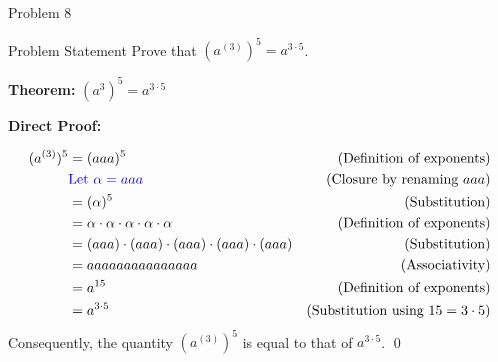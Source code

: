 \begin{problem}{Problem 8}
    \begin{statement}{Problem Statement}
        Prove that $(a^{(3)})^{5} = a^{3\cdot5}$.
    \end{statement}

    \begin{highlight}[Solution]
        \textbf{Theorem:} $(a^{3})^{5} = a^{3\cdot 5}$ \vspace*{1em}

        \textbf{Direct Proof:} \vspace*{1em}

        \begin{align*}
            (a^{(3)})^{5} & = (aaa)^{5} & \text{(Definition of exponents)} \\
            & \textcolor{blue}{\text{Let } \alpha = aaa} & \text{(Closure by renaming $aaa$)} \\
            & = (\alpha)^{5} & \text{(Substitution)} \\
            & = \alpha \cdot \alpha \cdot \alpha \cdot \alpha \cdot \alpha & \text{(Definition of exponents)} \\
            & = (aaa) \cdot (aaa) \cdot (aaa) \cdot (aaa) \cdot (aaa) & \text{(Substitution)} \\
            & = aaaaaaaaaaaaaaa & \text{(Associativity)} \\
            & = a^{15} & \text{(Definition of exponents)} \\
            & = a^{3\cdot 5} & \text{(Substitution using $15 = 3 \cdot 5$)}
        \end{align*}
        Consequently, the quantity $(a^{(3)})^{5}$ is equal to that of $a^{3 \cdot 5}$. \qed
    \end{highlight}
\end{problem}

